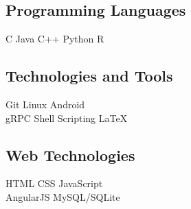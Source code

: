 \documentclass[]{chowes-resume}
\begin{document}
\begin{minipage}[t]{0.33\textwidth}
\subsection{Programming Languages}
C \textbullet{} Java \textbullet{} C++ \textbullet{} Python \textbullet{} R
\sectionsep

\subsection{Technologies and Tools}
Git \textbullet{} Linux \textbullet{} Android \\
gRPC \textbullet{} Shell Scripting \textbullet{} \LaTeX
\sectionsep

\subsection{Web Technologies}
HTML \textbullet{} CSS \textbullet{} JavaScript \\ 
AngularJS \textbullet{} MySQL/SQLite
\sectionsep


%
%

\end{minipage} 
\hfill
\end{document}
